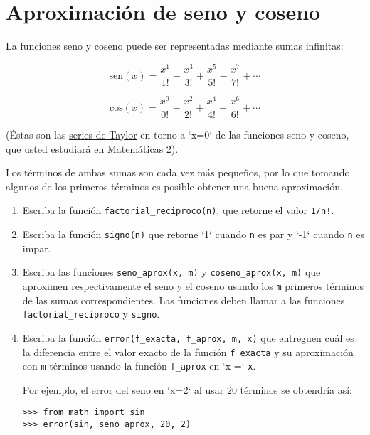 \section{Aproximación de seno y coseno}

La funciones seno y coseno puede ser representadas mediante sumas
infinitas:

\[\text{sen}(x) =
\frac{x^1}{1!} -
\frac{x^3}{3!} +
\frac{x^5}{5!} -
\frac{x^7}{7!} +
\cdots\]

\[\text{cos}(x) =
\frac{x^0}{0!} -
\frac{x^2}{2!} +
\frac{x^4}{4!} -
\frac{x^6}{6!} +
\cdots\]

(Éstas son las
\href{http://es.wikipedia.org/wiki/Serie\_de\_Taylor}{series de Taylor}
en torno a `x=0` de las funciones seno y coseno, que usted estudiará en
Matemáticas 2).

Los términos de ambas sumas son cada vez más pequeños, por lo que
tomando algunos de los primeros términos es posible obtener una buena
aproximación.

\begin{enumerate}
\item
  Escriba la función \lstinline!factorial_reciproco(n)!, que retorne el
  valor \lstinline"1/n!".
\item
  Escriba la función \lstinline!signo(n)! que retorne `1` cuando
  \lstinline!n! es par y `-1` cuando \lstinline!n! es impar.
\item
  Escriba las funciones \lstinline!seno_aprox(x, m)! y
  \lstinline!coseno_aprox(x, m)! que aproximen respectivamente el seno y
  el coseno usando los \lstinline!m! primeros términos de las sumas
  correspondientes. Las funciones deben llamar a las funciones
  \lstinline!factorial_reciproco! y \lstinline!signo!.
\item
  Escriba la función \lstinline!error(f_exacta, f_aprox, m, x)! que
  entreguen cuál es la diferencia entre el valor exacto de la función
  \lstinline!f_exacta! y su aproximación con \lstinline!m! términos
  usando la función \lstinline!f_aprox! en `x =` \lstinline!x!.

  Por ejemplo, el error del seno en `x=2` al usar 20 términos se
  obtendría así:

\begin{lstlisting}
>>> from math import sin
>>> error(sin, seno_aprox, 20, 2)
\end{lstlisting}
\end{enumerate}
